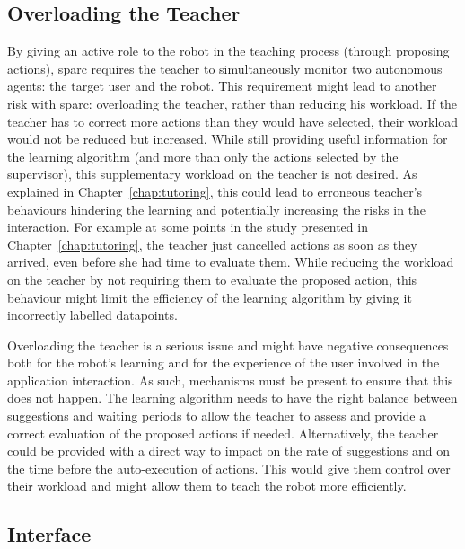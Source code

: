 \subsection{Overloading the Teacher}

By giving an active role to the robot in the teaching process (through proposing actions), \gls{sparc} requires  the teacher to simultaneously monitor two autonomous agents: the target user and the robot. This requirement might lead to another risk with \gls{sparc}: overloading the teacher, rather than reducing his workload. If the teacher has to correct more actions than they would have selected, their workload would not be reduced but increased. While still providing useful information for the learning algorithm (and more than only the actions selected by the supervisor), this supplementary workload on the teacher is not desired. As explained in Chapter~\ref{chap:tutoring}, this could lead to erroneous teacher's behaviours hindering the learning and potentially increasing the risks in the interaction. For example at some points in the study presented in Chapter~\ref{chap:tutoring}, the teacher just cancelled actions as soon as they arrived, even before she had time to evaluate them. While reducing the workload on the teacher by not requiring them to evaluate the proposed action, this behaviour might limit the efficiency of the learning algorithm by giving it incorrectly labelled datapoints. 

Overloading the teacher is a serious issue and might have negative consequences both for the robot's learning and for the experience of the user involved in the application interaction. As such, mechanisms must be present to ensure that this does not happen. The learning algorithm needs to have the right balance between suggestions and waiting periods to allow the teacher to assess and provide a correct evaluation of the proposed actions if needed. Alternatively, the teacher could be provided with a direct way to impact on the rate of suggestions and on the time before the auto-execution of actions. This would give them control over their workload and might allow them to teach the robot more efficiently.

\subsection{Interface}\label{sec:disc_lim_interface}

